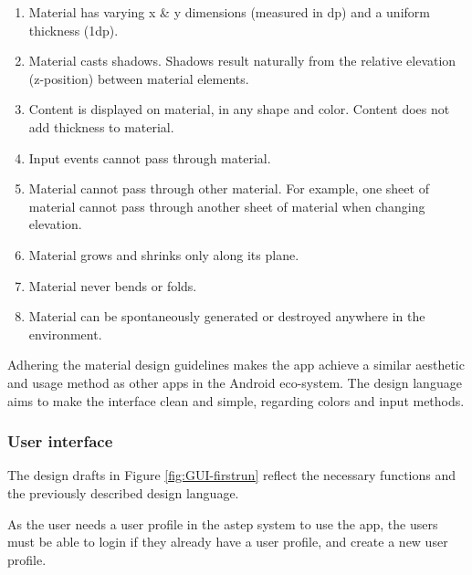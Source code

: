 \begin{enumerate}
	\item Material has varying x \& y dimensions (measured in dp) and a uniform thickness (1dp).
	\item Material casts shadows. Shadows result naturally from the relative elevation (z-position) between material elements.
	\item Content is displayed on material, in any shape and color. Content does not add thickness to material.
	\item Input events cannot pass through material.
	\item Material cannot pass through other material. For example, one sheet of material cannot pass through another sheet of material when changing elevation.
	\item Material grows and shrinks only along its plane.
	\item Material never bends or folds.
	\item Material can be spontaneously generated or destroyed anywhere in the environment.
\end{enumerate} 

Adhering the material design guidelines makes the app achieve a similar aesthetic and usage method as other apps in the Android eco-system. 
The design language aims to make the interface clean and simple, regarding colors and input methods.

\subsubsection{User interface}
The design drafts in Figure \ref{fig:GUI-firstrun} reflect the necessary functions and the previously described design language. 

As the user needs a user profile in the \gls{astep} system to use the app, the users must be able to login if they already have a user profile, and create a new user profile.


